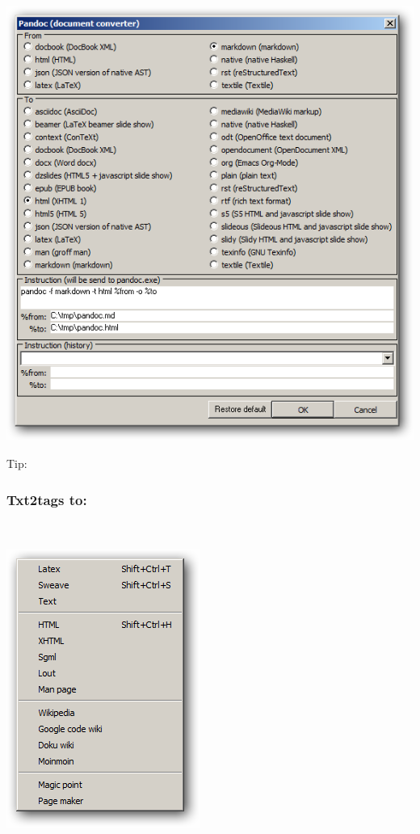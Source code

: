 \includegraphics[scale=.50]{./res/pandoc.png}

Tip: 


\hypertarget{menu_tools_processing_conversion_txt2tags}{}
\subsubsection{Txt2tags to:}\\

\includegraphics[scale=0.50]{./res/menu_tools_processing_conversion_txt2tags.png}\\

